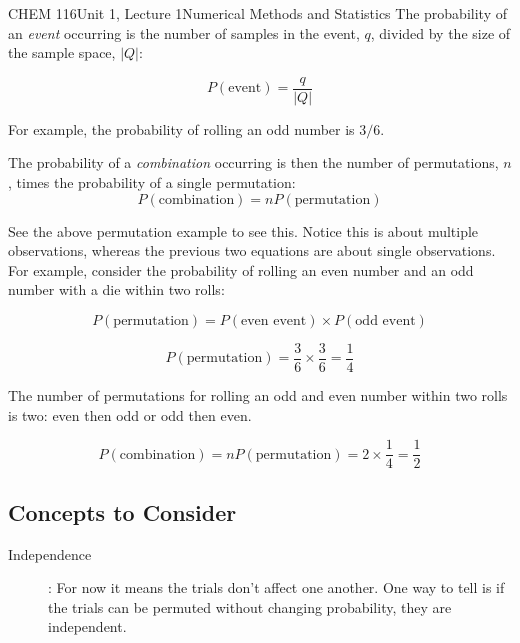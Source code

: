 \documentclass{article}
\begin{document}
\begin{tdoc}{CHEM 116}{Unit 1, Lecture 1}{Numerical Methods and Statistics}
The probability of an \emph{event} occurring is the number of samples
in the event, $q$, divided by the size of the sample space, $|Q|$:

\begin{equation}
P(\textrm{event}) = \frac{q}{|Q|}
\end{equation}

For example, the probability of rolling an odd number is $3 / 6$.


The probability of a \emph{combination} occurring is then the number of
permutations, $n$, times the probability of a single permutation:
\begin{equation}
P(\textrm{combination}) = n P(\textrm{permutation})
\end{equation}
\vspace{0.2cm}

See the above permutation example to see this. Notice this is about multiple observations, whereas the previous two equations are about single observations. For example, consider the probability of rolling an even number and an odd number with a die within two rolls:

\begin{equation}
P(\textrm{permutation}) = P(\textrm{even event}) \times P(\textrm{odd event})
\end{equation}

\begin{equation}
P(\textrm{permutation}) = \frac{3}{6} \times \frac{3}{6} = \frac{1}{4}
\end{equation}

The number of permutations for rolling an odd and even number within two rolls is two: even then odd or odd then even.

\begin{equation}
P(\textrm{combination}) = n P(\textrm{permutation}) = 2 \times \frac{1}{4} = \frac{1}{2}
\end{equation}

\subsection{Concepts to Consider}

\begin{description}

\item [Independence]: For now it means the trials don't affect one
another. One way to tell is if the trials can be permuted without changing probability, they are
independent.\vspace{0.2cm}\\


\end{description}
\end{tdoc}
\end{document}
